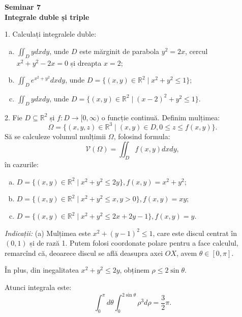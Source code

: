 \documentclass[11pt,a4paper]{article}
\newcommand\kal{\mathcal}
\newcommand\ds{\displaystyle}
\newcommand\seq{\subseteq}
\newcommand\RR{\mathbb{R}}
\theoremstyle{dotless}
\theoremstyle{dotlessdr}
\begin{document}
\begin{center}
  {\large\textbf{Seminar 7 \\ Integrale duble și triple}}
\end{center}

\vspace{1cm}

1. Calculați integralele duble:
\begin{enumerate}[(a)]
\item $ \ds\iint_D ydxdy $, unde $ D $ este mărginit de parabola $ y^2 = 2x $,
  cercul $ x^2 + y^2 - 2x = 0 $ și dreapta $ x = 2 $;
\item $ \ds\iint_D e^{x^2 + y^2} dxdy $, unde $ D = \{(x, y) \in \RR^2 \mid x^2 + y^2 \leq 1 \} $;
\item $ \ds\iint_D ydxdy $, unde $ D = \{(x, y) \in \RR^2 \mid (x - 2)^2 + y^2 \leq 1 \} $.
\end{enumerate}

\vspace{1cm}

2. Fie $ D \seq \RR^2 $ și $ f : D \to [0, \infty) $ o funcție continuă. Definim
mulțimea:
\[
  \Omega = \{ (x, y, z) \in \RR^3 \mid (x, y) \in D, 0 \leq z \leq f(x, y) \}.
\]
Să se calculeze volumul mulțimii $ \Omega $, folosind formula:
\[
  \kal{V}(\Omega) = \iint_D f(x, y) dxdy,
\]
în cazurile:
\begin{enumerate}[(a)]
\item $ D = \{(x, y) \in \RR^2 \mid x^2 + y^2 \leq 2y \}, f(x, y) = x^2 + y^2 $;
\item $ D = \{(x, y) \in \RR^2 \mid x^2 + y^2 \leq x, y > 0 \}, f(x, y) = xy $;
\item $ D = \{(x, y) \in \RR^2 \mid x^2 + y^2 \leq 2x + 2y - 1 \}, f(x, y) = y $.
\end{enumerate}

\vspace{1cm}

\emph{Indicații:} (a) Mulțimea este $ x^2 + (y - 1)^2 \leq 1 $, care este discul
centrat în $ (0, 1) $ și de rază 1. Putem folosi coordonate polare pentru a face
calculul, remarcînd că, deoarece discul se află deasupra axei $ OX $, avem
$ \theta \in [0, \pi] $.

În plus, din inegalitatea $ x^2 + y^2 \leq 2y $, obținem $ \rho \leq 2 \sin \theta $.

Atunci integrala este:
\[
  \int_0^\pi d\theta \int_0^{2 \sin \theta} \rho^3 d\rho = \frac{3}{2}\pi.
\]

\vspace{1cm}
\end{document}
